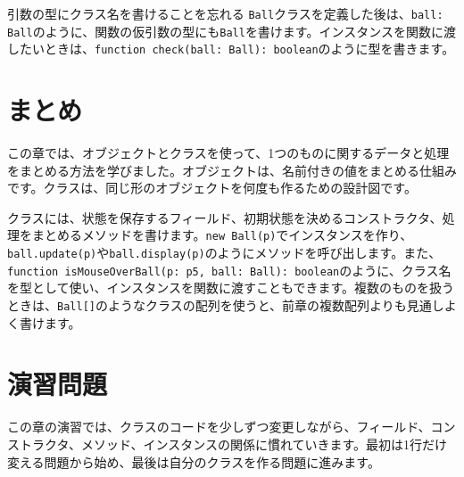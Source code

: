 \begin{mistakebox}{引数の型にクラス名を書けることを忘れる}
\texttt{Ball}クラスを定義した後は、\texttt{ball: Ball}のように、関数の仮引数の型にも\texttt{Ball}を書けます。インスタンスを関数に渡したいときは、\texttt{function check(ball: Ball): boolean}のように型を書きます。
\end{mistakebox}

\section{まとめ}

この章では、オブジェクトとクラスを使って、1つのものに関するデータと処理をまとめる方法を学びました。オブジェクトは、名前付きの値をまとめる仕組みです。クラスは、同じ形のオブジェクトを何度も作るための設計図です。

クラスには、状態を保存するフィールド、初期状態を決めるコンストラクタ、処理をまとめるメソッドを書けます。\texttt{new Ball(p)}でインスタンスを作り、\texttt{ball.update(p)}や\texttt{ball.display(p)}のようにメソッドを呼び出します。また、\texttt{function isMouseOverBall(p: p5, ball: Ball): boolean}のように、クラス名を型として使い、インスタンスを関数に渡すこともできます。複数のものを扱うときは、\texttt{Ball[]}のようなクラスの配列を使うと、前章の複数配列よりも見通しよく書けます。

\section{演習問題}

この章の演習では、クラスのコードを少しずつ変更しながら、フィールド、コンストラクタ、メソッド、インスタンスの関係に慣れていきます。最初は1行だけ変える問題から始め、最後は自分のクラスを作る問題に進みます。

